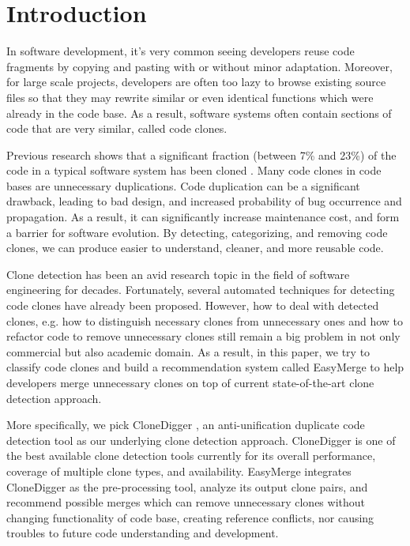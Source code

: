 \documentclass{acm_proc_article-sp}
\begin{document}


\section{Introduction}
In software development, it's very common seeing developers reuse code fragments by copying and pasting with or without minor adaptation.
Moreover, for large scale projects, developers are often too lazy to browse existing source files so that they may rewrite similar or even identical functions which
were already in the code base. As a result, software systems often contain sections of code that are very similar, called code clones.

Previous research shows that a significant fraction (between 7\% and 23\%) of the code in a typical software system has been cloned \cite{baker} \cite{roy1}. Many code clones
in code bases are unnecessary duplications. 
Code duplication can be a significant drawback, leading to bad design, and increased probability of bug occurrence and propagation. As a result, it can significantly
increase maintenance cost, and form a barrier for software evolution. By detecting, categorizing,
and removing code clones, we can produce easier to understand, cleaner, and more reusable code.

Clone detection has been an avid research topic in the field of software engineering for decades. Fortunately, several automated techniques for detecting code clones
have already been proposed. However, how to deal with detected clones, e.g. how to distinguish necessary clones from unnecessary ones and how to refactor code to remove
unnecessary clones still remain a big problem in not only commercial but also academic domain. As a result, in this paper, we try to classify code clones and build
a recommendation system called EasyMerge to help developers merge unnecessary clones on top of current state-of-the-art clone detection approach.

More specifically, we pick CloneDigger \cite{bulychev}, an anti-unification duplicate code detection tool as our underlying clone detection approach. CloneDigger is one of the best available 
clone detection tools currently for its overall performance, coverage of multiple clone types, and availability. 
EasyMerge integrates CloneDigger as the pre-processing tool, analyze its output clone pairs, and recommend possible merges which can remove unnecessary clones without changing functionality of code base, creating reference conflicts, nor causing troubles to future code understanding and development.
\end{document}
